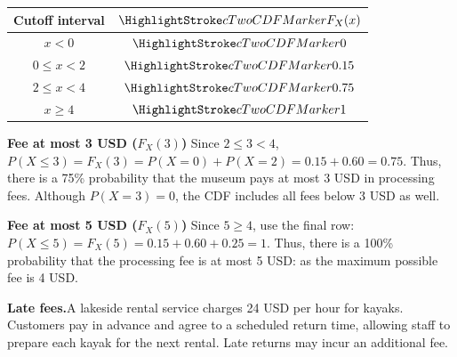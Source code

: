 \par%
\noindent%
\begin{minipage}[t]{.37\linewidth}%
  \vspace{0pt}\centering
  \begin{tabular}{cc}%
    \toprule
    Cutoff interval & $\cTwoCDFHL{F_X(x)}$ \\ \midrule
    $x<0$ & $\cTwoCDFHL{0}$ \\
    $0\leq x<2$ & $\cTwoCDFHL{0.15}$ \\
    $2\leq x<4$ & $\cTwoCDFHL{0.75}$ \\
    $x\geq 4$ & $\cTwoCDFHL{1}$ \\
    \bottomrule%
  \end{tabular}
\end{minipage}%
\hfill%
\begin{minipage}[t]{.60\linewidth}%
  \vspace{0pt}\centering
\end{minipage}%
\par


\textbf{Fee at most 3 USD ($F_X(3)$)} Since $2\leq3<4$,
$P(X\leq3)=F_X(3)=P(X=0)+P(X=2)=0.15+0.60=0.75$.
Thus, there is a 75\% probability that the museum pays at most 3 USD in processing fees. Although $P(X=3)=0$, the CDF
includes all fees below 3 USD as well.

\textbf{Fee at most 5 USD ($F_X(5)$)} Since $5\geq4$, use the final row:
$P(X\leq5)=F_X(5)=0.15+0.60+0.25=1$.
Thus, there is a 100\% probability that the processing fee is at most 5 USD: as the maximum possible fee is 4 USD.
\endgroup

 \vspace{-5mm}
\begingroup\small
\textbf{Late fees.}A lakeside rental service charges 24 USD per hour for kayaks. Customers pay in
advance and agree to a scheduled return time, allowing staff to prepare each
kayak for the next rental. Late returns may incur an additional fee.

